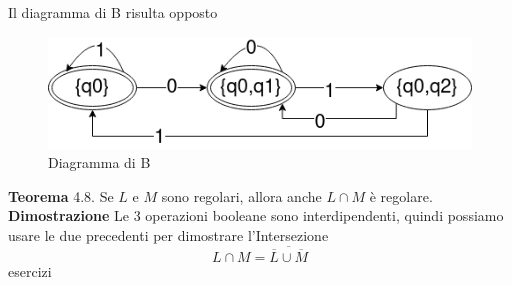 \documentclass[12pt]{article}
\begin{document}
\newpage
Il diagramma di B risulta opposto
\begin{figure}[h]
  \includegraphics[scale = 0.5]{media/prop2.png}
  \centering
  \caption{Diagramma di B}
\end{figure}

\textbf{Teorema} 4.8. Se $L$ e $M$ sono regolari, allora anche $L \cap M$ è regolare.
\vspace{5mm}
\textbf{Dimostrazione} Le 3 operazioni booleane sono interdipendenti, quindi possiamo usare le due precedenti per dimostrare l'Intersezione
\[L\cap M = \overline{\overline{L} \cup \overline{M}}\]
\newpage
{esercizi}
\end{document}
